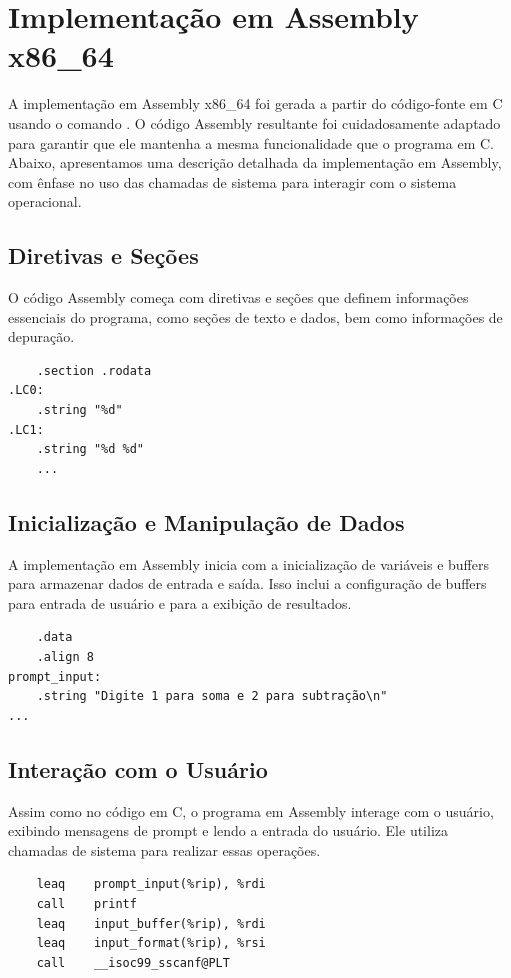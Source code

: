 \documentclass[
	12pt,				%
	openright,			%
	oneside,			%
	a4paper,			%
	chapter=TITLE,		%
	english,			%
	french,				%
	spanish,			%
	brazil				%
	]{abntex2}
\theoremstyle{definition}
\begin{document}
\section{Implementação em Assembly x86\_64}

A implementação em Assembly x86\_64 foi gerada a partir do código-fonte em C usando o comando 
. O código Assembly resultante foi cuidadosamente adaptado para garantir que ele 
mantenha a mesma funcionalidade que o programa em C. Abaixo, apresentamos uma descrição detalhada da 
implementação em Assembly, com ênfase no uso das chamadas de sistema para interagir com o sistema operacional.

\subsection{Diretivas e Seções}

O código Assembly começa com diretivas e seções que definem informações essenciais do programa, 
como seções de texto e dados, bem como informações de depuração.

\begin{verbatim}
    .section .rodata
.LC0:
    .string "%d"
.LC1:
    .string "%d %d"
    ...
\end{verbatim}

\subsection{Inicialização e Manipulação de Dados}

A implementação em Assembly inicia com a inicialização de variáveis e buffers para 
armazenar dados de entrada e saída. Isso inclui a configuração de buffers para entrada de 
usuário e para a exibição de resultados.

\begin{verbatim}
    .data
    .align 8
prompt_input:
    .string "Digite 1 para soma e 2 para subtração\n"
...
\end{verbatim}

\subsection{Interação com o Usuário}

Assim como no código em C, o programa em Assembly interage com o usuário, exibindo 
mensagens de prompt e lendo a entrada do usuário. Ele utiliza chamadas de sistema 
para realizar essas operações.

\begin{verbatim}
    leaq    prompt_input(%rip), %rdi
    call    printf
    leaq    input_buffer(%rip), %rdi
    leaq    input_format(%rip), %rsi
    call    __isoc99_sscanf@PLT
\end{verbatim}
\end{document}
